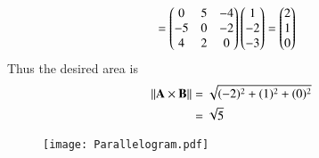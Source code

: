 \documentclass[journal,12pt,twocolumn]{IEEEtran}
\renewcommand\thesection{\arabic{section}}
\begin{document}
\begin{enumerate}[label=\thesection.\arabic*.,ref=\thesection.\theenumi]
\begin{enumerate}
\begin{align}
       &=\begin{pmatrix}0&5&-4\\-5&0&-2\\4&2&0\end{pmatrix}\begin{pmatrix}1\\-2\\-3\end{pmatrix}=\begin{pmatrix}2\\1\\0\end{pmatrix}
   \end{align}
   Thus the desired area is 
   \begin{align}
       \left\lVert\mathbf{A}\times\mathbf{B}\right\rVert&=\sqrt{(-2)^2+(1)^2+(0)^2}\\
       &=\sqrt{5}
   \end{align}
\begin{figure}[h]
\centering
\texttt{[image: Parallelogram.pdf]}
\label{Fig 1.2}
\end{figure}
\end{enumerate}
\end{enumerate}
\end{document}
